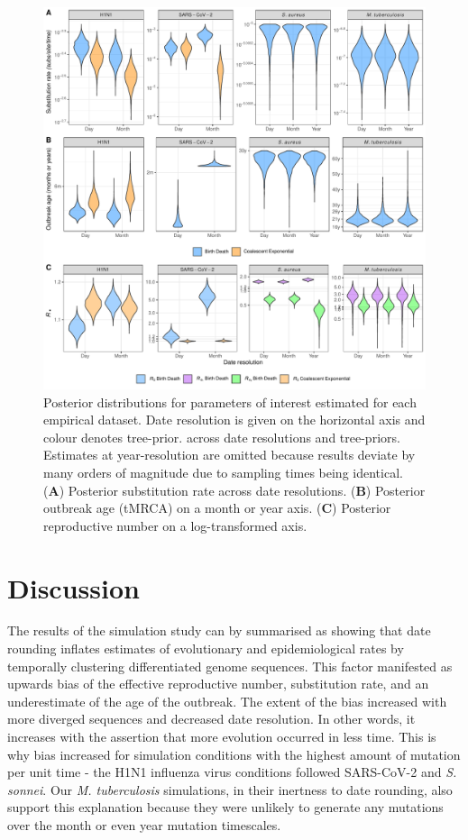 \documentclass{article}
\begin{document}
\begin{spacing}{1.5}
\begin{figure}[h!]
    \centering
    \includegraphics[width=\textwidth]{empirical_parms.pdf}
    \caption{Posterior distributions for parameters of interest estimated for each empirical dataset. Date resolution is given on the horizontal axis and colour denotes tree-prior. across date resolutions and tree-priors. Estimates at year-resolution are omitted because results deviate by many orders of magnitude due to sampling times being identical. (\textbf{A}) Posterior substitution rate across date resolutions. (\textbf{B}) Posterior outbreak age (tMRCA) on a month or year axis.  (\textbf{C}) Posterior reproductive number on a log-transformed axis.}
    \label{fig:emp-parm}
\end{figure}

\section*{Discussion}

The results of the simulation study can by summarised as showing that date rounding inflates estimates of evolutionary and epidemiological rates by temporally clustering differentiated genome sequences. This factor manifested as upwards bias of the effective reproductive number, substitution rate, and an underestimate of the age of the outbreak. The extent of the bias increased with more diverged sequences and decreased date resolution. In other words, it increases with the assertion that more evolution occurred in less time. This is why bias increased for simulation conditions with the highest amount of mutation per unit time - the H1N1 influenza virus conditions followed SARS-CoV-2 and \textit{S. sonnei}. Our \textit{M. tuberculosis} simulations, in their inertness to date rounding, also support this explanation because they were unlikely to generate any mutations over the month or even year mutation timescales.


\end{spacing}
\end{document}
